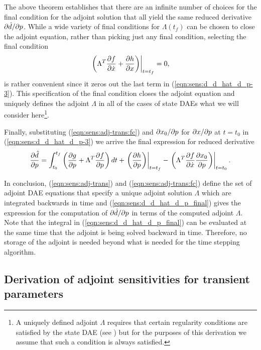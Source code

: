 \documentclass[pdf,ps2pdf,11pt]{SANDreport}
\begin{document}
The above theorem establishes that there are an infinite number of choices for
the final condition for the adjoint solution that all yield the same reduced
derivative $\partial \hat{d} / \partial p$.  While a wide variety of final conditions for
$\Lambda(t_f)$ can be chosen to close the adjoint equation, rather than
picking just any final condition, selecting the final condition
%
\begin{equation}
\left. \left(
  \Lambda^T \displaystyle{\frac{\partial f}{\partial \dot{x}}}
  +  \displaystyle{\frac{\partial h}{\partial x}}
\right) \right|_{t=t_f}
 = 0,
\label{eqn:sens:adj-trans:fc}
\end{equation}
%
is rather convenient since it zeros out the last term in
(\ref{eqn:sens:d_d_hat_d_p-3}).  This specification of the final condition
closes the adjoint equation and uniquely defines the adjoint $\Lambda$ in all
of the cases of state DAEs what we will consider here\footnote{A uniquely
defined adjoint $\Lambda$ requires that certain regularity conditions are
satisfied by the state DAE (see {}\cite{adjoint-sens-2003}) but for the
purposes of this derivation we assume that such a condition is always
satisfied.}.

Finally, substituting (\ref{eqn:sens:adj-trans:fc}) and
$\partial x_0 / \partial p$ for $\partial x / \partial p$ at $t=t_0$ in
(\ref{eqn:sens:d_d_hat_d_p-3}) we arrive the final expression for
reduced derivative
%
\begin{equation}
\displaystyle{\frac{\partial \hat{d}}{\partial p}} =
\int_{t_0}^{t_f} \left(
    \displaystyle{\frac{\partial g}{\partial p}}
    + \Lambda^T \displaystyle{\frac{\partial f}{\partial p}}
  \right) dt
  + \left. \left( \displaystyle{\frac{\partial h}{\partial p}} \right) \right|_{t=t_f}
  - \left. \left( \Lambda^T \displaystyle{\frac{\partial f}{\partial \dot{x}}} \displaystyle{\frac{\partial x_0}{\partial p}} \right) \right|_{t=t_0}.
\label{eqn:sens:d_d_hat_d_p_final}
\end{equation}

In conclusion, (\ref{eqn:sens:adj-trans}) and (\ref{eqn:sens:adj-trans:fc})
define the set of adjoint DAE equations that specify a unique adjoint solution
$\Lambda$ which are integrated backwards in time and
(\ref{eqn:sens:d_d_hat_d_p_final}) gives the expression for the computation of
$\partial \hat{d} / \partial p$ in terms of the computed adjoint $\Lambda$.  Note that the
integral in (\ref{eqn:sens:d_d_hat_d_p_final}) can be evaluated at the same
time that the adjoint is being solved backward in time.  Therefore, no storage
of the adjoint is needed beyond what is needed for the time stepping
algorithm.

\subsection{Derivation of adjoint sensitivities for transient parameters}
\end{document}
